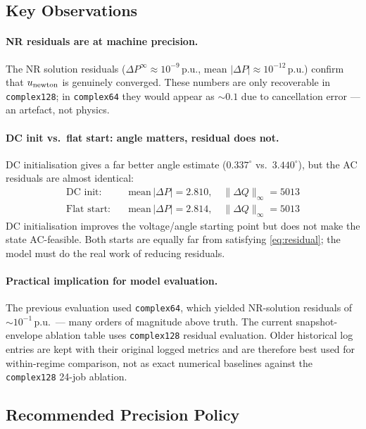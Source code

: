 \documentclass{article}
\begin{document}
\subsection{Key Observations}

\paragraph{NR residuals are at machine precision.}
The NR solution residuals ($\Delta P^\infty \approx 10^{-9}$\,p.u.,
mean $|\Delta P| \approx 10^{-12}$\,p.u.) confirm that $u_{\rm newton}$
is genuinely converged.  These numbers are only recoverable in
\texttt{complex128}; in \texttt{complex64} they would appear as $\sim0.1$
due to cancellation error --- an artefact, not physics.

\paragraph{DC init vs.\ flat start: angle matters, residual does not.}
DC initialisation gives a far better angle estimate ($0.337^\circ$ vs.\
$3.440^\circ$), but the AC residuals are almost identical:
\begin{align*}
  \text{DC init:}   &\quad \text{mean}\,|\Delta P| = 2.810,\quad \|\Delta Q\|_\infty = 5013 \\
  \text{Flat start:}&\quad \text{mean}\,|\Delta P| = 2.814,\quad \|\Delta Q\|_\infty = 5013
\end{align*}
DC initialisation improves the voltage/angle starting point but does not
make the state AC-feasible.  Both starts are equally far from satisfying
\eqref{eq:residual}; the model must do the real work of reducing residuals.

\paragraph{Practical implication for model evaluation.}
The previous evaluation used \texttt{complex64}, which yielded
NR-solution residuals of $\sim 10^{-1}$\,p.u.\ --- many orders of
magnitude above truth.  The current snapshot-envelope ablation table uses
\texttt{complex128} residual evaluation.  Older historical log entries are
kept with their original logged metrics and are therefore best used for
within-regime comparison, not as exact numerical baselines against the
\texttt{complex128} 24-job ablation.

\subsection{Recommended Precision Policy}
\end{document}
